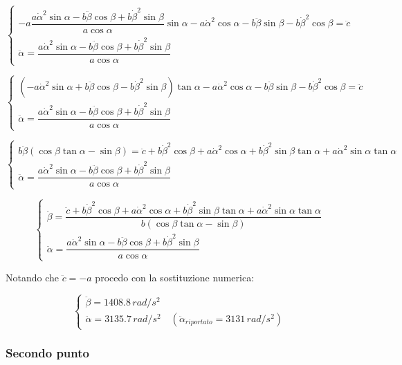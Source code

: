 \documentclass[main.tex]{subfiles}
\begin{document}
\[
	\begin{cases}
		-a\dfrac{a\dot{\alpha}^2\sin{\alpha} - b\ddot{\beta}\cos{\beta} +  b\dot{\beta}^2\sin{\beta}}{a\cos{\alpha}}\sin{\alpha} - a\dot{\alpha}^2\cos{\alpha} - b\ddot{\beta}\sin{\beta} -  b\dot{\beta}^2\cos{\beta} = \ddot{c} \\
		\ddot{\alpha} =  \dfrac{a\dot{\alpha}^2\sin{\alpha} - b\ddot{\beta}\cos{\beta} +  b\dot{\beta}^2\sin{\beta}}{a\cos{\alpha}}
	\end{cases}
\]

\[
	\begin{cases}
		(-a\dot{\alpha}^2\sin{\alpha} + b\ddot{\beta}\cos{\beta} -  b\dot{\beta}^2\sin{\beta})\tan{\alpha} - a\dot{\alpha}^2\cos{\alpha} - b\ddot{\beta}\sin{\beta} -  b\dot{\beta}^2\cos{\beta} = \ddot{c} \\
		\ddot{\alpha} =  \dfrac{a\dot{\alpha}^2\sin{\alpha} - b\ddot{\beta}\cos{\beta} +  b\dot{\beta}^2\sin{\beta}}{a\cos{\alpha}}
	\end{cases}
\]

\[
	\begin{cases}
		b\ddot{\beta}(\cos{\beta}\tan{\alpha} - \sin{\beta}) = \ddot{c} + b\dot{\beta}^2\cos{\beta} + a\dot{\alpha}^2\cos{\alpha} + b\dot{\beta}^2\sin{\beta}\tan{\alpha} + a\dot{\alpha}^2\sin{\alpha}\tan\alpha\\
		\ddot{\alpha} =  \dfrac{a\dot{\alpha}^2\sin{\alpha} - b\ddot{\beta}\cos{\beta} +  b\dot{\beta}^2\sin{\beta}}{a\cos{\alpha}}
	\end{cases}
\]

\[
	\begin{cases}
		\ddot{\beta} = \dfrac{\ddot{c} + b\dot{\beta}^2\cos{\beta} + a\dot{\alpha}^2\cos{\alpha} + b\dot{\beta}^2\sin{\beta}\tan{\alpha} + a\dot{\alpha}^2\sin{\alpha}\tan\alpha}{b(\cos{\beta}\tan{\alpha} - \sin{\beta})}\\
		\ddot{\alpha} =  \dfrac{a\dot{\alpha}^2\sin{\alpha} - b\ddot{\beta}\cos{\beta} +  b\dot{\beta}^2\sin{\beta}}{a\cos{\alpha}}
	\end{cases}
\]

Notando che $\ddot{c} = -a$ procedo con la sostituzione numerica:

\[
	\begin{cases}
		\ddot{\beta} = 1408.8\,rad/s^2\\
		\ddot{\alpha} =  3135.7\,rad/s^2 \quad (\ddot{\alpha}_{riportato} =  3131\,rad/s^2)
	\end{cases}
\]

\subsubsection{Secondo punto}
\end{document}

